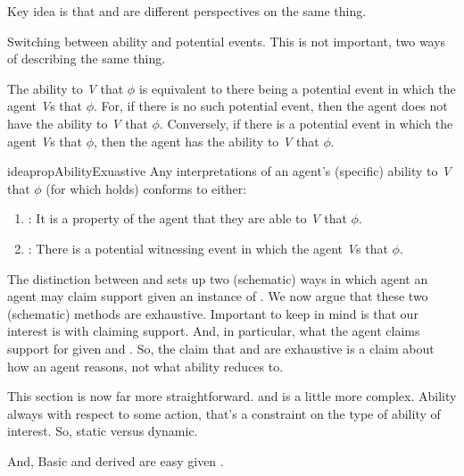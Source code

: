 \begin{note}
  Key idea is that \AR{} and \WR{} are different perspectives on the same thing.

  Switching between ability and potential events.
  This is not important, two ways of describing the same thing.

  The ability to \emph{V} that \(\phi\) is equivalent to there being a potential event in which the agent \emph{V}s that \(\phi\).
  For, if there is no such potential event, then the agent does not have the ability to \emph{V} that \(\phi\).
  Conversely, if there is a potential event in which the agent \emph{V}s that \(\phi\), then the agent has the ability to \emph{V} that \(\phi\).
\end{note}

\begin{note}[Exhaustive]
    \begin{restatable}[]{idea}{propAbilityExuastive}\label{prop:WR-and-AR-exhaustive}\label{either-AR-or-WR}
    Any interpretations of an agent's (specific) ability to \emph{V} that \(\phi\) (for which  holds) conforms to either:
    \begin{enumerate}
    \item \AR{}: It is a property of the agent that they are able to \emph{V} that \(\phi\).
    \item \WR{}: There is a potential witnessing event in which the agent \emph{V}s that \(\phi\).
    \end{enumerate}
    \vspace{-\baselineskip}
  \end{restatable}
\end{note}

\begin{note}
  The distinction between \AR{} and \WR{} sets up two (schematic) ways in which agent an agent may claim support given an instance of .
  We now argue that these two (schematic) methods are exhaustive.
  {
    \color{red}
    Important to keep in mind is that our interest is with claiming support.
    And, in particular, what the agent claims support for given \AR{} and \WR{}.
    So, the claim that \AR{} and \WR{} are exhaustive is a claim about how an agent reasons, not what ability reduces to.
  }
\end{note}

\begin{note}
  \color{red}
  This section is now far more straightforward.
  \AR{} and \WR{} is a little more complex.
  Ability always with respect to some action, that's a constraint on the type of ability of interest.
  So, static versus dynamic.


  And, Basic and derived are easy given \AR{}.
\end{note}

